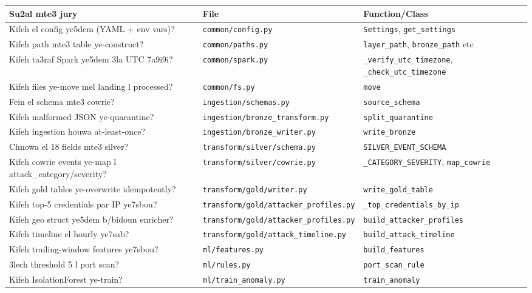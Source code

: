 \documentclass[11pt,a4paper]{report}
\DeclareRobustCommand{\code}[1]{\texttt{#1}}
\DeclareRobustCommand{\file}[1]{\texttt{\color{amber}#1}}
\begin{document}
\begin{longtable}{p{} p{} p{}}
\toprule
\textbf{Su2al mte3 jury} & \textbf{File} & \textbf{Function/Class} \\
\midrule
\endhead
Kifeh el config ye5dem (YAML + env vars)? & \file{common/config.py} & \code{Settings}, \code{get\_settings} \\
Kifeh path mte3 table ye-construct? & \file{common/paths.py} & \code{layer\_path}, \code{bronze\_path} etc \\
Kifeh ta3raf Spark ye5dem 3la UTC 7a9i9i? & \file{common/spark.py} & \code{\_verify\_utc\_timezone}, \code{\_check\_utc\_timezone} \\
Kifeh files ye-move mel landing l processed? & \file{common/fs.py} & \code{move} \\
Fein el schema mte3 cowrie? & \file{ingestion/schemas.py} & \code{source\_schema} \\
Kifeh malformed JSON ye-quarantine? & \file{ingestion/bronze\_transform.py} & \code{split\_quarantine} \\
Kifeh ingestion houwa at-least-once? & \file{ingestion/bronze\_writer.py} & \code{write\_bronze} \\
Chnowa el 18 fields mte3 silver? & \file{transform/silver/schema.py} & \code{SILVER\_EVENT\_SCHEMA} \\
Kifeh cowrie events ye-map l attack\_category/severity? & \file{transform/silver/cowrie.py} & \code{\_CATEGORY\_SEVERITY}, \code{map\_cowrie} \\
Kifeh gold tables ye-overwrite idempotently? & \file{transform/gold/writer.py} & \code{write\_gold\_table} \\
Kifeh top-5 credentials par IP ye7sbou? & \file{transform/gold/attacker\_profiles.py} & \code{\_top\_credentials\_by\_ip} \\
Kifeh geo struct ye5dem b/bidoun enricher? & \file{transform/gold/attacker\_profiles.py} & \code{build\_attacker\_profiles} \\
Kifeh timeline el hourly ye7sab? & \file{transform/gold/attack\_timeline.py} & \code{build\_attack\_timeline} \\
Kifeh trailing-window features ye7sbou? & \file{ml/features.py} & \code{build\_features} \\
3lech threshold 5 l port scan? & \file{ml/rules.py} & \code{port\_scan\_rule} \\
Kifeh IsolationForest ye-train? & \file{ml/train\_anomaly.py} & \code{train\_anomaly} \\

\end{longtable}
\end{document}
